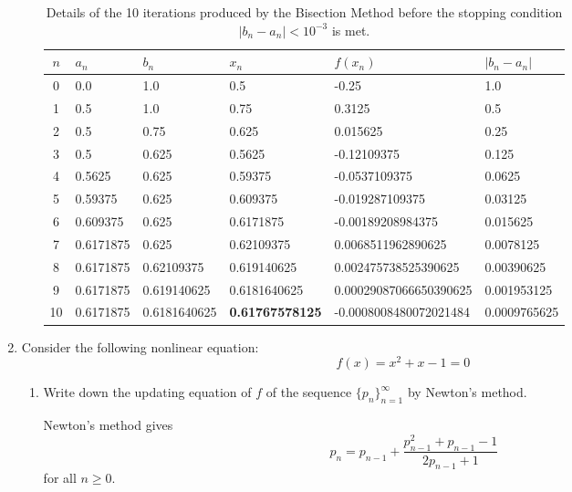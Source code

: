 \documentclass[11pt,oneside,english,reqno]{amsart}
\theoremstyle{definition}
\newcommand{\1}{\mathbbm{1}}
\begin{document}
\begin{enumerate}[leftmargin=*]
\begin{enumerate}
\begin{table}
\centering
\caption{Details of the 10 iterations produced by the Bisection Method before the stopping condition $|b_n-a_n|<10^{-3}$ is met.}\label{tbl:BM1}
\begin{tabular}{|c|l|l|l|l|l|}
\hline
$n$ & $a_n$ & $b_n$ & $x_n$ & $f(x_n)$ & $|b_n-a_n|$ \\
\hline
0 & 0.0 & 1.0 & 0.5 & -0.25 & 1.0 \\
1 & 0.5 & 1.0 & 0.75 & 0.3125 & 0.5 \\
2 & 0.5 & 0.75 & 0.625 & 0.015625 & 0.25 \\
3 & 0.5 & 0.625 & 0.5625 & -0.12109375 & 0.125 \\
4 & 0.5625 & 0.625 & 0.59375 & -0.0537109375 & 0.0625 \\
5 & 0.59375 & 0.625 & 0.609375 & -0.019287109375 & 0.03125 \\
6 & 0.609375 & 0.625 & 0.6171875 & -0.00189208984375 & 0.015625 \\
7 & 0.6171875 & 0.625 & 0.62109375 & 0.0068511962890625 & 0.0078125 \\
8 & 0.6171875 & 0.62109375 & 0.619140625 & 0.002475738525390625 & 0.00390625 \\
9 & 0.6171875 & 0.619140625 & 0.6181640625 & 0.00029087066650390625 & 0.001953125 \\
10 & 0.6171875 & 0.6181640625 & \bf{0.61767578125} & -0.0008008480072021484 & 0.0009765625 \\
\hline
\end{tabular}
\end{table}
\end{enumerate}

\pagebreak
















\item Consider the following nonlinear equation:
\[
f(x)=x^2+x-1=0
\]
\begin{enumerate}
\itemsep5mm

\item Write down the updating equation of $f$ of the sequence $\{p_n\}_{n=1}^\infty$ by Newton's method.

Newton's method gives
\begin{equation}\label{eq:NM1}
p_{n}=p_{n-1}+\frac{p_{n-1}^2+p_{n-1}-1}{2p_{n-1}+1}
\end{equation}
for all $n\geq0$.


\end{enumerate}
\end{enumerate}
\end{document}
